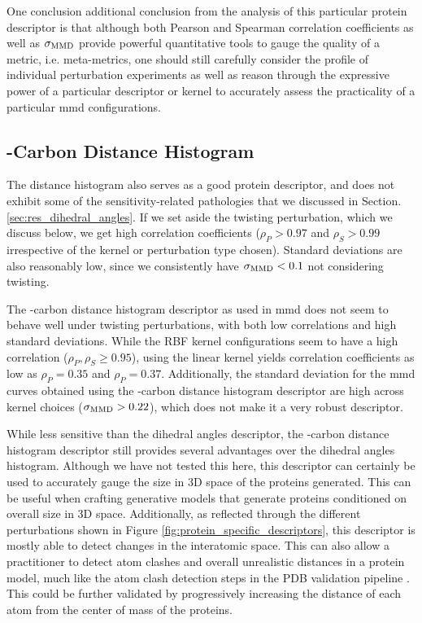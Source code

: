One conclusion additional conclusion from the analysis of this particular
protein descriptor is that although both Pearson and Spearman correlation
coefficients as well as $\sigma_{\text{MMD}}$ provide powerful quantitative tools to
gauge the quality of a metric, i.e. meta-metrics, one should still carefully
consider the profile of individual perturbation experiments as well as reason
through the expressive power of a particular descriptor or kernel to accurately
assess the practicality of a particular \gls{mmd} configurations.


\subsection{\textalpha{}-Carbon Distance Histogram}\label{sec:results_dist_hist}

The distance histogram also serves as a good protein descriptor, and does not
exhibit some of the sensitivity-related pathologies that we discussed in Section.
\ref{sec:res_dihedral_angles}. If we set aside the twisting perturbation, which
we discuss below, we get high correlation coefficients ($\rho_P>0.97$ and
$\rho_S>0.99$ irrespective of the kernel or perturbation type chosen). Standard
deviations are also reasonably low, since we consistently have $\sigma_{\text{MMD}}<0.1$
not considering twisting.

The \textalpha{}-carbon distance histogram descriptor as used in \gls{mmd} does not
seem to behave well under twisting perturbations, with both low correlations and
high standard deviations. While the RBF kernel configurations seem to have a
high correlation ($\rho_P,\rho_S\geq 0.95$), using the linear kernel yields
correlation coefficients as low as $\rho_P=0.35$ and $\rho_P=0.37$.
Additionally, the standard deviation for the \gls{mmd} curves obtained using the
\textalpha{}-carbon distance histogram descriptor are high across kernel choices
($\sigma_{\text{MMD}}>0.22$), which does not make it a very robust descriptor.

While less sensitive than the dihedral angles descriptor, the
\textalpha{}-carbon distance histogram descriptor still provides several
advantages over the dihedral angles histogram. Although we have not tested
this here, this descriptor can certainly be used to accurately gauge the size in
3D space of the proteins generated. This can be useful when crafting generative
models that generate proteins conditioned on overall size in 3D space.
Additionally, as reflected through the different perturbations shown in Figure
\ref{fig:protein_specific_descriptors}, this descriptor is mostly able to detect
changes in the interatomic space. This can also allow a practitioner to detect
atom clashes and overall unrealistic distances in a protein model, much like the
atom clash detection steps in the PDB validation pipeline \citep{read2011new,
gore2012implementing, gore2017validation}. This could be further validated by
progressively increasing the distance of each atom from the center of mass of
the proteins.

